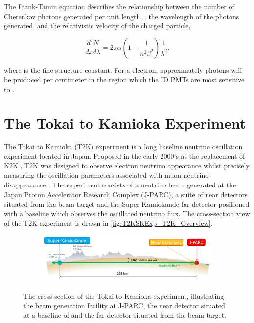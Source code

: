 The Frank-Tamm equation \cite{Frank1991-wj} describes the relationship between the number of Cherenkov photons generated per unit length, , the wavelength of the photons generated, \quickmath{\lambda} and the relativistic velocity of the charged particle,

\begin{equation}
  \label{eq:T2KSKExp_FrankTammFormula}
  \frac{d^2N}{dxd\lambda} = 2\pi\alpha \left(1 - \frac{1}{n^2 \beta^2} \right)\frac{1}{\lambda^2} .
\end{equation}

where \quickmath{\alpha} is the fine structure constant. For a  electron, approximately  photons will be produced per centimeter in the  region which the ID PMTs are most sensitive to \cite{Fukuda2003-ly}.


\section{The Tokai to Kamioka Experiment}
\label{sec:T2KSKExp_T2K}

The Tokai to Kamioka (T2K) experiment is a long baseline neutrino oscillation experiment located in Japan. Proposed in the early 2000's \cite{jhf_loi, Itow2001-vw} as the replacement of K2K \cite{The_K2K_Collaboration2001-oo}, T2K was designed to observe electron neutrino appearance whilst precisely measuring the oscillation parameters associated with muon neutrino disappearance \cite{t2k_proposal}. The experiment consists of a neutrino beam generated at the Japan Proton Accelerator Research Complex (J-PARC), a suite of near detectors situated  from the beam target and the Super Kamiokande far detector positioned with a  baseline which observes the oscillated neutrino flux. The cross-section view of the T2K experiment is drawn in \autoref{fig:T2KSKExp_T2K_Overview}.

\begin{figure}[h]
  \begin{subfigure}[t]{0.95\textwidth}
    \includegraphics[width=\textwidth, trim={0mm 0mm 0mm 0mm}, clip,page=1]{Figures/Detectors/T2KCrossSection.pdf}
  \end{subfigure}
  \caption{The cross section of the Tokai to Kamioka experiment, illustrating the beam generation facility at J-PARC, the near detector situated at a baseline of  and the far detector situated  from the beam target.}
  \label{fig:T2KSKExp_T2K_Overview}
\end{figure}

